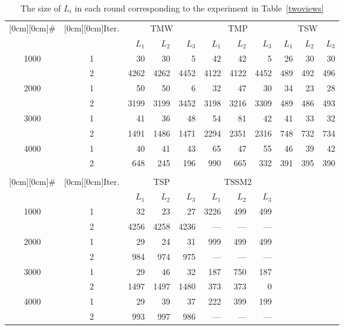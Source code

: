 \documentclass[english]{jnlp_1.4}
\begin{document}
\begin{table}[b]
\centering \caption{The size of $L_{i}$ in each round
corresponding to the experiment in Table~\ref{twoviews}}
\label{tab:sizeLi}
\begin{tabular}{|c|c|r|r|r|r|r|r|r|r|r|}
\hline
 \raisebox{-1.50ex}[0cm][0cm]{\#} & \raisebox{-1.50ex}[0cm][0cm]{Iter.} & \multicolumn{3}{|c|}{TMW} & \multicolumn{3}{|c|}{TMP} & \multicolumn{3}{|c|}{TSW} \\
\cline{3-11} & &  $L_{1}$ & $L_{2}$ & $L_{3}$ & $L_{1}$ &  $L_{2}$ & $L_{3}$ & $L_{1}$ & $L_{2}$ &  $L_{3}$  \\
  \hline
\multirow{2}{*}{1000} &   1 & 30 & 30 & 5  & 42 & 42 & 5 &  26 & 30 & 30  \\
  & 2 & 4262 & 4262 & 4452 &  4122 & 4122 & 4452 & 489 & 492 & 496   \\
  \hline
\multirow{2}{*}{2000} &   1 & 50 & 50 & 6 & 32 & 47 & 30 & 34 & 23 & 28   \\
  & 2 & 3199 & 3199 & 3452 &  3198 & 3216 & 3309 & 489 & 486 & 493   \\
  \hline
\multirow{2}{*}{3000} &   1 & 41 & 36 & 48  & 54 & 81 & 42 & 41 & 33 & 32  \\
  & 2 & 1491 & 1486 & 1471 &  2294 & 2351 & 2316 & 748 & 732 & 734   \\
  \hline
\multirow{2}{*}{4000} &  1 & 40 & 41 & 43  & 65 & 47 & 55 &  46 & 39 & 42  \\
  & 2 & 648 & 245 & 196  & 990 & 665 & 332 & 391 & 395 & 390   \\
\hline
\multicolumn{11}{c}{} \\
 \cline{1-8}
 \raisebox{-1.50ex}[0cm][0cm]{\#} & \raisebox{-1.50ex}[0cm][0cm]{Iter.} & \multicolumn{3}{|c|}{TSP} & \multicolumn{3}{|c|}{TSSM2} & \multicolumn{3}{c}{} \\
\cline{3-8} & &  $L_{1}$ & $L_{2}$ & $L_{3}$ & $L_{1}$ &  $L_{2}$ & $L_{3}$ &  \multicolumn{3}{|c}{}   \\
\cline{1-8}
\multirow{2}{*}{1000} &   1 & 32 & 23 & 27  & 3226 & 499 & 499 &   \multicolumn{3}{|c}{}   \\
  & 2 & 4256 & 4258 & 4236 &  --- & --- & --- &  \multicolumn{3}{|c}{}   \\
\cline{1-8}
\multirow{2}{*}{2000} &   1 & 29 & 24 & 31   & 999 & 499 & 499 &  \multicolumn{3}{|c}{}     \\
  & 2 & 984 & 974 & 975 &  --- & --- & --- &  \multicolumn{3}{|c}{}  \\
\cline{1-8}
\multirow{2}{*}{3000} &   1 & 29 & 46 & 32   & 187 & 750 & 187 &  \multicolumn{3}{|c}{}   \\
  & 2 & 1497 & 1497 & 1480 & 373 & 373 & 0 &  \multicolumn{3}{|c}{}  \\
\cline{1-8}
\multirow{2}{*}{4000} &  1 & 29 & 39 & 37  & 222 & 399 & 199 &  \multicolumn{3}{|c}{}  \\
  & 2 & 993 & 997 & 986   & --- & --- & --- &  \multicolumn{3}{|c}{}  \\
\cline{1-8}
\end{tabular}
\end{table}
\end{document}

